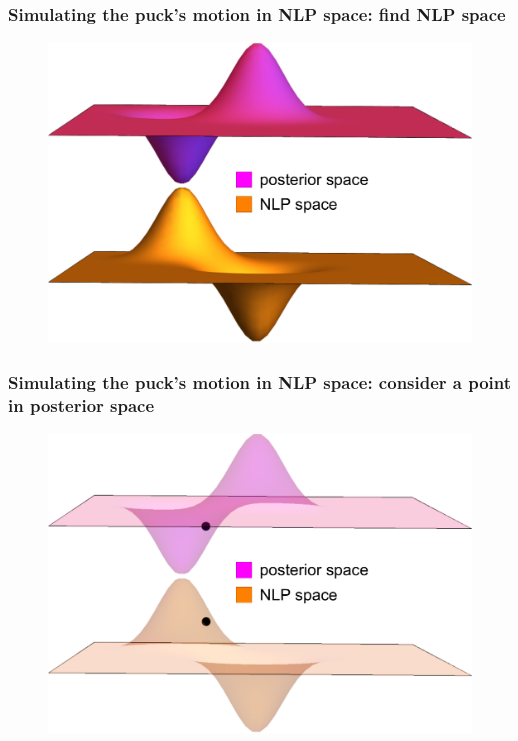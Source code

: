 \documentclass[handout]{beamer}
\begin{document}
\begin{frame}
	\frametitle{Simulating the puck's motion in NLP space: find NLP space}
	
	\begin{figure}[ht]
		\centerline{\includegraphics[width=1\textwidth]{./Figures/lec5_nlpPosterior1.pdf}}
	\end{figure}
	
\end{frame}

\begin{frame}
	\frametitle{Simulating the puck's motion in NLP space: consider a point in posterior space}
	
	\begin{figure}[ht]
		\centerline{\includegraphics[width=1\textwidth]{./Figures/lec5_nlpPosterior2.pdf}}
	\end{figure}
	
\end{frame}
\end{document}
